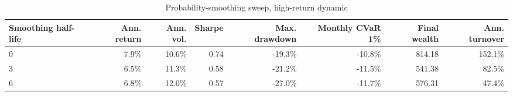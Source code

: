 ﻿\begin{table}[!htbp]
\centering
\caption{Probability-smoothing sweep, high-return dynamic}
\label{tab:allocation-smoothing-high-return}
\small
\setlength{\tabcolsep}{5pt}
\renewcommand{\arraystretch}{1.12}
\begin{adjustbox}{center,max width=\linewidth}
\begin{tabular}{lrrrrrrr}
\toprule
Smoothing half-life & Ann. return & Ann. vol. & Sharpe & Max. drawdown & Monthly CVaR 1\% & Final wealth & Ann. turnover \\
\midrule
0 & 7.9\% & 10.6\% & 0.74 & -19.3\% & -10.8\% & 814.18 & 152.1\% \\
3 & 6.5\% & 11.3\% & 0.58 & -21.2\% & -11.5\% & 541.38 & 82.5\% \\
6 & 6.8\% & 12.0\% & 0.57 & -27.0\% & -11.7\% & 576.31 & 47.4\% \\
\bottomrule
\end{tabular}
\end{adjustbox}
\end{table}
